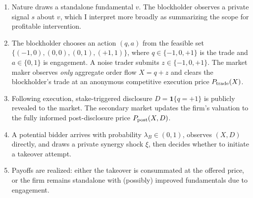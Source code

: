 \documentclass[11pt]{article}
\newcommand{\1}{\mathbf{1}}
\begin{document}
\begin{enumerate}[leftmargin=2em]
\item[$t=0$:] Nature draws a standalone fundamental $v$. The blockholder observes a private signal $s$ about $v$, which I interpret more broadly as summarizing the scope for profitable intervention.
\item[$t=1$:] The blockholder chooses an action $(q,a)$ from the feasible set $\{(-1,0),(0,0),(0,1),(+1,1)\}$, where $q \in \{-1,0,+1\}$ is the trade and $a \in \{0,1\}$ is engagement. A noise trader submits $z \in \{-1, 0, +1\}$. The market maker observes \emph{only} aggregate order flow $X = q + z$ and clears the blockholder's trade at an anonymous competitive execution price $P_{\textup{trade}}(X)$.
\item[$t=1.2$:] Following execution, stake-triggered disclosure $D=\1\{q=+1\}$ is publicly revealed to the market. The secondary market updates the firm's valuation to the fully informed post-disclosure price $P_{\textup{post}}(X,D)$.
\item[$t=1.5$:] A potential bidder arrives with probability $\lambda_B \in (0,1)$, observes $(X,D)$ directly, and draws a private synergy shock $\xi$, then decides whether to initiate a takeover attempt.
\item[$t=2$:] Payoffs are realized: either the takeover is consummated at the offered price, or the firm remains standalone with (possibly) improved fundamentals due to engagement.
\end{enumerate}
\end{document}
